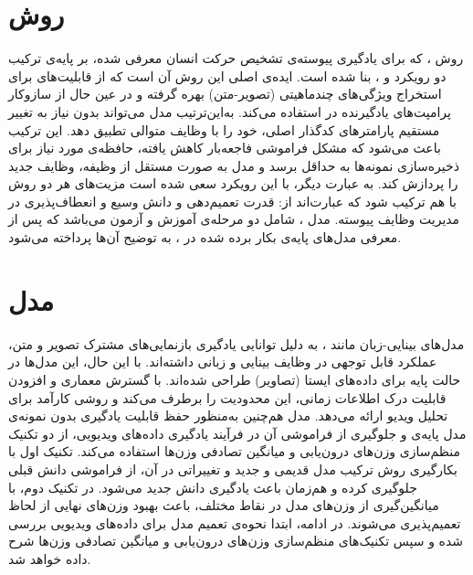 \section{روش }
روش
،
که برای یادگیری پیوسته‌ی تشخیص حرکت انسان معرفی شده، بر پایه‌ی ترکیب دو رویکرد
و
،
بنا شده است. ایده‌ی اصلی این روش آن است که از قابلیت‌های  برای استخراج ویژگی‌های چندماهیتی (تصویر-متن) بهره گرفته و در عین حال از سازوکار پرامپت‌های یادگیرنده در  استفاده می‌کند. به‌این‌ترتیب مدل می‌تواند بدون نیاز به تغییر مستقیم پارامتر‌های کدگذار اصلی، خود را با وظایف متوالی تطبیق دهد. این ترکیب باعث می‌شود که مشکل فراموشی فاجعه‌بار کاهش یافته، حافظه‌ی مورد نیاز برای ذخیره‌سازی نمونه‌ها به حداقل برسد و مدل به صورت مستقل از وظیفه، وظایف جدید را پردازش کند. به عبارت دیگر، با این رویکرد سعی شده است مزیت‌های هر دو روش با هم ترکیب شود که عبارت‌اند از: قدرت تعمیم‌دهی و دانش وسیع  و انعطاف‌پذیری  در مدیریت وظایف پیوسته. مدل ، شامل دو مرحله‌‌ی آموزش  و آزمون می‌باشد که پس از معرفی مدل‌های پایه‌‌ی بکار برده شده در
،
به توضیح آن‌ها پرداخته می‌شود.

\section{مدل }
مدل‌های بینایی-زبان مانند ، به دلیل توانایی یادگیری بازنمایی‌های مشترک تصویر و متن، عملکرد قابل توجهی در وظایف بینایی و زبانی داشته‌اند. با این حال، این مدل‌ها در حالت پایه برای داده‌های ایستا (تصاویر) طراحی شده‌اند.  با گسترش معماری  و افزودن قابلیت درک اطلاعات زمانی، این محدودیت را برطرف می‌کند و روشی کارآمد برای تحلیل ویدیو ارائه می‌دهد. مدل
هم‌چنین به‌منظور حفظ قابلیت یادگیری بدون نمونه‌ی مدل پایه‌ی
و جلوگیری از فراموشی آن در فرآیند یادگیری داده‌های ویدیویی، از دو تکنیک منظم‌سازی وزن‌های درون‌یابی  و میانگین تصادفی وزن‌ها  استفاده می‌کند. تکنیک اول با بکارگیری روش ترکیب مدل قدیمی و جدید و تغییراتی در آن، از فراموشی دانش قبلی جلوگیری کرده و هم‌زمان باعث یادگیری دانش جدید می‌شود. در تکنیک دوم، با میانگین‌گیری از وزن‌های مدل در نقاط مختلف، باعث بهبود وزن‌های نهایی از لحاظ تعمیم‌پذیری می‌شوند. در ادامه، ابتدا نحوه‌ی تعمیم مدل  برای داده‌های ویدیویی بررسی شده و سپس تکنیک‌های منظم‌سازی وزن‌های درون‌یابی و میانگین تصادفی وزن‌ها شرح داده خواهد شد. 

